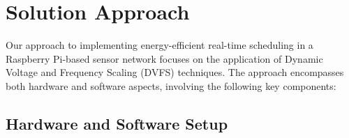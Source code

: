\documentclass[twocolumn, 10pt]{article}
\begin{document}
\vspace{5mm}

\section*{Solution Approach}
\vspace{-2mm}
Our approach to implementing energy-efficient real-time scheduling in a Raspberry Pi-based sensor network focuses on the application of Dynamic Voltage and Frequency Scaling (DVFS) techniques. The approach encompasses both hardware and software aspects, involving the following key components:

\vspace{-2mm}

\subsection*{Hardware and Software Setup}
\end{document}
